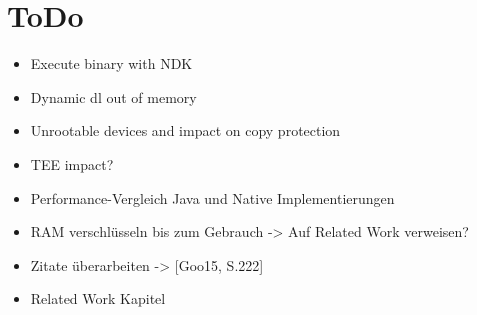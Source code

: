\chapter{ToDo}

\begin{itemize}
\item Execute binary with NDK
\item Dynamic dl out of memory
\item Unrootable devices and impact on copy protection
\item TEE impact?
\item Performance-Vergleich Java und Native Implementierungen
\item RAM verschlüsseln bis zum Gebrauch -> Auf Related Work verweisen?
\item Zitate überarbeiten -> [Goo15, S.222]
\item Related Work Kapitel
\end{itemize}